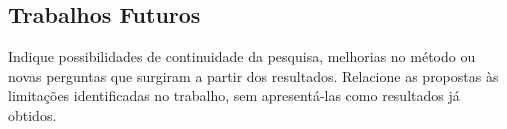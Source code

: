 
\subsection{Trabalhos Futuros}

Indique possibilidades de continuidade da pesquisa, melhorias no método ou
novas perguntas que surgiram a partir dos resultados. Relacione as propostas
às limitações identificadas no trabalho, sem apresentá-las como resultados
já obtidos.
